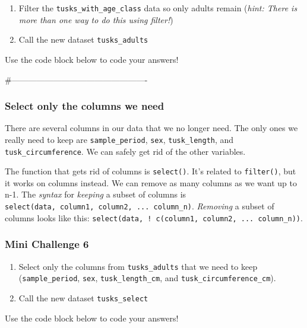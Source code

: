\documentclass[
]{article}
\providecommand{\tightlist}{%
  \setlength{\itemsep}{0pt}\setlength{\parskip}{0pt}}
\begin{document}
\begin{enumerate}
\def\labelenumi{\arabic{enumi}.}
\tightlist
\item
  Filter the \texttt{tusks\_with\_age\_class} data so only adults remain
  (\emph{hint: There is more than one way to do this using filter!})
\item
  Call the new dataset \texttt{tusks\_adults}
\end{enumerate}

Use the code block below to code your answers!

\#-------------------------------------------------

\subsubsection{Select only the columns we
need}\label{select-only-the-columns-we-need}

There are several columns in our data that we no longer need. The only
ones we really need to keep are \texttt{sample\_period}, \texttt{sex},
\texttt{tusk\_length}, and \texttt{tusk\_circumference}. We can safely
get rid of the other variables.

The function that gets rid of columns is \texttt{select()}. It's related
to \texttt{filter()}, but it works on columns instead. We can remove as
many columns as we want up to n-1. The \emph{syntax} for \emph{keeping}
a subset of columns is
\texttt{select(data,\ column1,\ column2,\ ...\ column\_n)}.
\emph{Removing} a subset of columns looks like this:
\texttt{select(data,\ !\ c(column1,\ column2,\ ...\ column\_n))}.

\subsubsection{\texorpdfstring{\textbf{Mini Challenge
6}}{Mini Challenge 6}}\label{mini-challenge-6}

\begin{enumerate}
\def\labelenumi{\arabic{enumi}.}
\tightlist
\item
  Select only the columns from \texttt{tusks\_adults} that we need to
  keep (\texttt{sample\_period}, \texttt{sex},
  \texttt{tusk\_length\_cm}, and \texttt{tusk\_circumference\_cm}).
\item
  Call the new dataset \texttt{tusks\_select}
\end{enumerate}

Use the code block below to code your answers!
\end{document}
